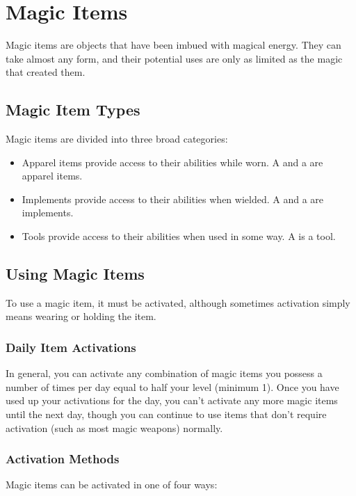 \chapter{Magic Items}

Magic items are objects that have been imbued with magical energy. They can take almost any form, and their potential uses are only as limited as the magic that created them.

\section{Magic Item Types}
    Magic items are divided into three broad categories:
    \begin{itemize}
        \item Apparel items provide access to their abilities while worn.
            A  and a  are apparel items.
        \item Implements provide access to their abilities when wielded.
            A  and a  are implements.
        \item Tools provide access to their abilities when used in some way.
            A  is a tool.
    \end{itemize}

\section{Using Magic Items}

    To use a magic item, it must be activated, although sometimes activation simply means wearing or holding the item.

    \subsection{Daily Item Activations}
        In general, you can activate any combination of magic items you possess a number of times per day equal to half your level (minimum 1).
        Once you have used up your activations for the day, you can't activate any more magic items until the next day, though you can continue to use items that don't require activation (such as most magic weapons) normally.

    \subsection{Activation Methods}
        Magic items can be activated in one of four ways:

